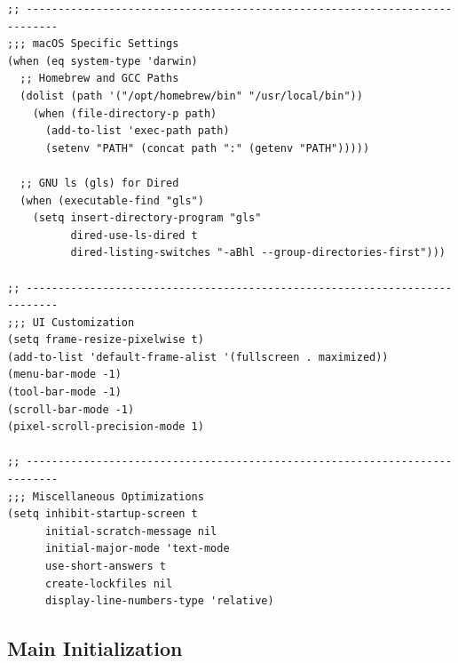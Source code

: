 \documentclass[11pt]{article}
\begin{document}
\begin{verbatim}
;; ---------------------------------------------------------------------------
;;; macOS Specific Settings
(when (eq system-type 'darwin)
  ;; Homebrew and GCC Paths
  (dolist (path '("/opt/homebrew/bin" "/usr/local/bin"))
    (when (file-directory-p path)
      (add-to-list 'exec-path path)
      (setenv "PATH" (concat path ":" (getenv "PATH")))))

  ;; GNU ls (gls) for Dired
  (when (executable-find "gls")
    (setq insert-directory-program "gls"
          dired-use-ls-dired t
          dired-listing-switches "-aBhl --group-directories-first")))

;; ---------------------------------------------------------------------------
;;; UI Customization
(setq frame-resize-pixelwise t)
(add-to-list 'default-frame-alist '(fullscreen . maximized))
(menu-bar-mode -1)
(tool-bar-mode -1)
(scroll-bar-mode -1)
(pixel-scroll-precision-mode 1)

;; ---------------------------------------------------------------------------
;;; Miscellaneous Optimizations
(setq inhibit-startup-screen t
      initial-scratch-message nil
      initial-major-mode 'text-mode
      use-short-answers t
      create-lockfiles nil
      display-line-numbers-type 'relative)

\end{verbatim}
\subsection{Main Initialization}
\label{sec:org8fcc6b7}
\end{document}
